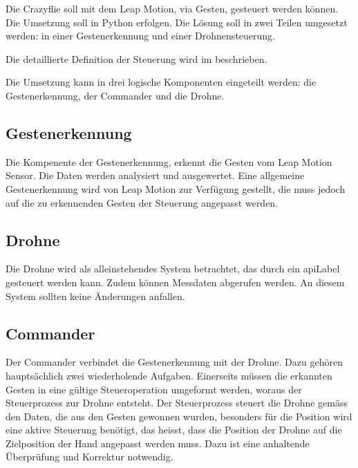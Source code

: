 Die Crazyflie soll mit dem Leap Motion, via Gesten, gesteuert werden können.
Die Umsetzung soll in Python erfolgen.
Die Lösung soll in zwei Teilen umgesetzt werden: in einer Gestenerkennung und einer Drohnensteuerung.

Die detaillierte Definition der Steuerung wird im  beschrieben.

Die Umsetzung kann in drei logische Komponenten eingeteilt werden: die Gestenerkennung, der Commander und die Drohne.

\subsection{Gestenerkennung}
Die Kompenente der Gestenerkennung, erkennt die Gesten vom Leap Motion Sensor. Die Daten werden analysiert und ausgewertet.
Eine allgemeine Gestenerkennung wird von Leap Motion zur Verfügung gestellt, die muss jedoch auf die zu erkennenden Gesten der Steuerung angepasst werden.

\subsection{Drohne}
Die Drohne wird als alleinstehendes System betrachtet, das durch ein \gls{apiLabel} gesteuert werden kann. Zudem können Messdaten abgerufen werden. An diesem System sollten keine Änderungen anfallen.

\subsection{Commander}
Der Commander verbindet die Gestenerkennung mit der Drohne.
Dazu gehören hauptsächlich zwei wiederholende Aufgaben.
Einerseits müssen die erkannten Gesten in eine gültige Steueroperation umgeformt werden, woraus der Steuerprozess zur Drohne entsteht.
Der Steuerprozess steuert die Drohne gemäss den Daten, die aus den Gesten gewonnen wurden, besonders für die Position wird eine aktive Steuerung benötigt, das heisst, dass die Position der Drohne auf die Zielposition der Hand angepasst werden muss. Dazu ist eine anhaltende Überprüfung und Korrektur notwendig.



